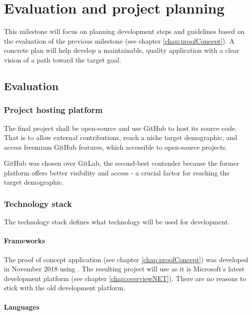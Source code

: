 \chapter{Evaluation and project planning} \label{chap:evalProjPlan}

This milestone will focus on planning development steps and guidelines based on the evaluation of the previous milestone (see chapter \ref{chap:proofConcept}).
A concrete plan will help develop a maintainable, quality application with a clear vision of a path toward the target goal.

\section{Evaluation}

\subsection{Project hosting platform}

The final project shall be open-source and use GitHub to host its source code.
That is to allow external contributions, reach a niche target demographic, and access freemium GitHub features, which accessible to open-source projects.

GitHub was chosen over GitLab, the second-best contender because the former platform offers better visibility and access - a crucial factor for reaching the target demographic.

\subsection{Technology stack}

The technology stack defines what technology will be used for development.

\subsubsection{Frameworks}

The proof of concept application (see chapter \ref{chap:proofConcept}) was developed in November 2018 using . The resulting project will use  as it is Microsoft's latest development platform (see chapter \ref{chap:overviewNET}). There are no reasons to stick with the old development platform.

\subsubsection{Languages}

